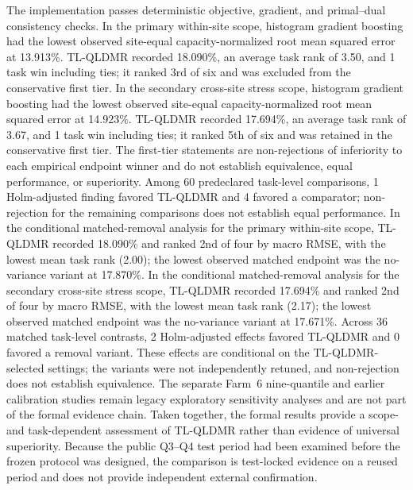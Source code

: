 \documentclass[a4paper]{cas-sc}
\begin{document}
{\color{blue}The implementation passes deterministic objective, gradient, and primal--dual consistency checks. In the primary within-site scope, histogram gradient boosting had the lowest observed site-equal capacity-normalized root mean squared error at 13.913\%. TL-QLDMR recorded 18.090\%, an average task rank of 3.50, and 1 task win including ties; it ranked 3rd of six and was excluded from the conservative first tier. In the secondary cross-site stress scope, histogram gradient boosting had the lowest observed site-equal capacity-normalized root mean squared error at 14.923\%. TL-QLDMR recorded 17.694\%, an average task rank of 3.67, and 1 task win including ties; it ranked 5th of six and was retained in the conservative first tier. The first-tier statements are non-rejections of inferiority to each empirical endpoint winner and do not establish equivalence, equal performance, or superiority. Among 60 predeclared task-level comparisons, 1 Holm-adjusted finding favored TL-QLDMR and 4 favored a comparator; non-rejection for the remaining comparisons does not establish equal performance. In the conditional matched-removal analysis for the primary within-site scope, TL-QLDMR recorded 18.090\% and ranked 2nd of four by macro RMSE, with the lowest mean task rank (2.00); the lowest observed matched endpoint was the no-variance variant at 17.870\%. In the conditional matched-removal analysis for the secondary cross-site stress scope, TL-QLDMR recorded 17.694\% and ranked 2nd of four by macro RMSE, with the lowest mean task rank (2.17); the lowest observed matched endpoint was the no-variance variant at 17.671\%. Across 36 matched task-level contrasts, 2 Holm-adjusted effects favored TL-QLDMR and 0 favored a removal variant. These effects are conditional on the TL-QLDMR-selected settings; the variants were not independently retuned, and non-rejection does not establish equivalence. The separate Farm~6 nine-quantile and earlier calibration studies remain legacy exploratory sensitivity analyses and are not part of the formal evidence chain. Taken together, the formal results provide a scope- and task-dependent assessment of TL-QLDMR rather than evidence of universal superiority. Because the public Q3--Q4 test period had been examined before the frozen protocol was designed, the comparison is test-locked evidence on a reused period and does not provide independent external confirmation.}
\end{document}
